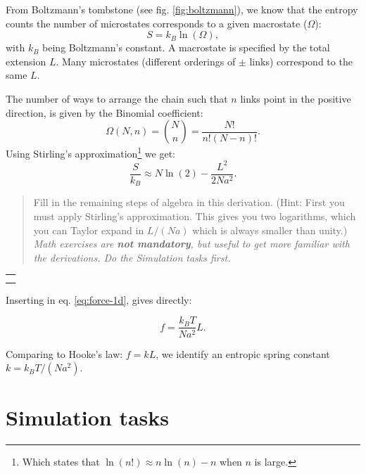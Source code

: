 \documentclass[11pt]{article}
\newcommand{\exercise}[1]{\par \vspace{0.5cm} \noindent  {\large \colorbox{mygrey}{\begin{minipage}{\textwidth}{\textbf{Math exercise}}\end{minipage}}} \par \noindent \begin{quote} 
\small{#1} \\
\footnotesize{\textit{Math exercises are \textbf{not mandatory}, but useful to get more familiar with the derivations. Do the Simulation tasks first.}}
\end{quote} 
\begin{tabular}{c} \\ \toprule \\ \hspace{15cm} \\ \end{tabular}}
\begin{document}
From Boltzmann's tombstone (see fig. \ref{fig:boltzmann}), we know that the entropy counts the number of microstates corresponds to a given macrostate ($\Omega$):
\begin{equation}
\label{eq:entropy-def}
  S = k_B\ln(\Omega),
\end{equation}
with $k_B$ being Boltzmann's constant. A macrostate is specified by the total extension $L$. Many microstates (different orderings of $\pm$ links) correspond to the same $L$. 

The number of ways to arrange the chain such that $n$ links point in the positive direction, is given by the Binomial coefficient:
\begin{equation}
  \Omega(N,n) = \binom{N}{n} = \frac{N!}{n!(N-n)!}.
\end{equation}
Using Stirling's approximation\footnote{Which states that $\ln(n!) \approx n \ln(n) - n$ when $n$ is large.} we get:
\begin{equation}
\frac{S}{k_B} \approx N\ln(2) - \frac{L^2}{2Na^2}.
\end{equation}

\exercise{
Fill in the remaining steps of algebra in this derivation. (Hint: First you must apply Stirling's approximation. This gives you two logarithms, which you can Taylor expand in $L/(Na)$ which is always smaller than unity.)
}

Inserting in eq. \eqref{eq:force-1d}, gives directly:

\begin{equation}
\label{eq:hookes-law}
  f = \frac{k_B T }{Na^2} L.
\end{equation}

Comparing to Hooke's law: $f = kL$, we identify an entropic spring constant $k = k_B T / (Na^2)$.

\section*{Simulation tasks}
\end{document}
